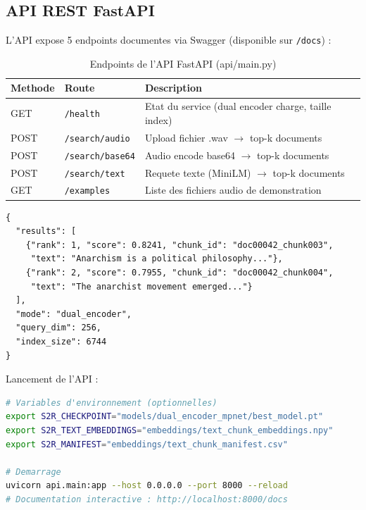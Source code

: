 \documentclass[12pt, a4paper]{article}
\begin{document}
\subsection{API REST FastAPI}

L'API expose 5 endpoints documentes via Swagger (disponible sur \texttt{/docs}) :

\begin{table}[H]
\centering
\caption{Endpoints de l'API FastAPI (api/main.py)}
\begin{tabularx}{\linewidth}{l l X}
\toprule
\textbf{Methode} & \textbf{Route} & \textbf{Description} \\
\midrule
GET  & \texttt{/health}        & Etat du service (dual encoder charge, taille index) \\
\rowcolor{silver}
POST & \texttt{/search/audio}  & Upload fichier .wav $\to$ top-k documents \\
POST & \texttt{/search/base64} & Audio encode base64 $\to$ top-k documents \\
\rowcolor{silver}
POST & \texttt{/search/text}   & Requete texte (MiniLM) $\to$ top-k documents \\
GET  & \texttt{/examples}      & Liste des fichiers audio de demonstration \\
\bottomrule
\end{tabularx}
\end{table}

\begin{lstlisting}[caption={Exemple de reponse /search/audio}]
{
  "results": [
    {"rank": 1, "score": 0.8241, "chunk_id": "doc00042_chunk003",
     "text": "Anarchism is a political philosophy..."},
    {"rank": 2, "score": 0.7955, "chunk_id": "doc00042_chunk004",
     "text": "The anarchist movement emerged..."}
  ],
  "mode": "dual_encoder",
  "query_dim": 256,
  "index_size": 6744
}
\end{lstlisting}

Lancement de l'API :

\begin{lstlisting}[language=bash, caption={Lancement de l'API FastAPI}]
# Variables d'environnement (optionnelles)
export S2R_CHECKPOINT="models/dual_encoder_mpnet/best_model.pt"
export S2R_TEXT_EMBEDDINGS="embeddings/text_chunk_embeddings.npy"
export S2R_MANIFEST="embeddings/text_chunk_manifest.csv"

# Demarrage
uvicorn api.main:app --host 0.0.0.0 --port 8000 --reload
# Documentation interactive : http://localhost:8000/docs
\end{lstlisting}
\end{document}
